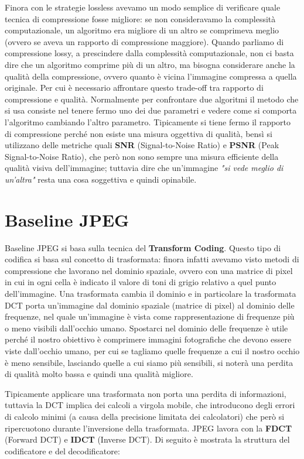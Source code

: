 Finora con le strategie lossless avevamo un modo semplice di verificare quale tecnica di compressione fosse migliore: se non consideravamo la complessità computazionale, un algoritmo era migliore di un altro se comprimeva meglio (ovvero se aveva un rapporto di compressione maggiore). Quando parliamo di compressione lossy, a prescindere dalla complessità computazionale, non ci basta dire che un algoritmo comprime più di un altro, ma bisogna considerare anche la qualità della compressione, ovvero quanto è vicina l'immagine compressa a quella originale. Per cui è necessario affrontare questo trade-off tra rapporto di compressione e qualità. Normalmente per confrontare due algoritmi il metodo che si usa consiste nel tenere fermo uno dei due parametri e vedere come si comporta l'algoritmo cambiando l'altro parametro. Tipicamente si tiene fermo il rapporto di compressione perché non esiste una misura oggettiva di qualità, bensì si utilizzano delle metriche quali \textbf{SNR} (Signal-to-Noise Ratio) e \textbf{PSNR} (Peak Signal-to-Noise Ratio), che però non sono sempre una misura efficiente della qualità visiva dell'immagine; tuttavia dire che un'immagine \textit{"si vede meglio di un'altra"} resta una cosa soggettiva e quindi opinabile. 

\section{Baseline JPEG}
Baseline JPEG si basa sulla tecnica del \textbf{Transform Coding}. Questo tipo di codifica si basa sul concetto di trasformata: finora infatti avevamo visto metodi di compressione che lavorano nel dominio spaziale, ovvero con una matrice di pixel in cui in ogni cella è indicato il valore di toni di grigio relativo a quel punto dell'immagine. Una trasformata cambia il dominio e in particolare la trasformata DCT porta un'immagine dal dominio spaziale (matrice di pixel) al dominio delle frequenze, nel quale un'immagine è vista come rappresentazione di frequenze più o meno visibili dall'occhio umano. Spostarci nel dominio delle frequenze è utile perché il nostro obiettivo è comprimere immagini fotografiche che devono essere viste dall'occhio umano, per cui se tagliamo quelle frequenze a cui il nostro occhio è meno sensibile, lasciando quelle a cui siamo più sensibili, si noterà una perdita di qualità molto bassa e quindi una qualità migliore.

\vspace{5mm}

Tipicamente applicare una trasformata non porta una perdita di informazioni, tuttavia la DCT implica dei calcoli a virgola mobile, che introducono degli errori di calcolo minimi (a causa della precisione limitata dei calcolatori) che però si ripercuotono durante l'inversione della trasformata. JPEG lavora con la \textbf{FDCT} (Forward DCT) e \textbf{IDCT} (Inverse DCT). Di seguito è mostrata la struttura del codificatore e del decodificatore:

